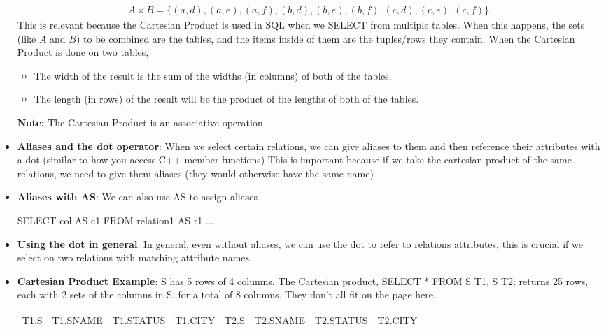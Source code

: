 \documentclass{report}
\begin{document}
\begin{itemize}
        \begin{align*}
            A \times B = \{(a, d), (a, e), (a, f), (b , d), (b , e), (b ,f), (c, d), (c, e), (c, f)\}
        .\end{align*}
        \bigbreak \noindent 
        This is relevant because the Cartesian Product is used in SQL when we SELECT from multiple tables. When this happens, the sets (like $A$ and $B$) to be combined are the tables, and the items inside of them are the tuples/rows they contain.
        \bigbreak \noindent 
        When the Cartesian Product is done on two tables,
        \begin{itemize}
            \item The width of the result is the sum of the widths (in columns) of both of the tables.
            \item The length (in rows) of the result will be the product of the lengths of both of the tables.
        \end{itemize}
        \bigbreak \noindent 
        \textbf{Note:} The Cartesian Product is an associative operation
    \item \textbf{Aliases and the dot operator}: When we select certain relations, we can give aliases to them and then reference their attributes with a dot (similar to how you access C++ member functions)
        \bigbreak \noindent 
        This is important because if we take the cartesian product of the same relations, we need to give them aliases (they would otherwise have the same name)
    \item \textbf{Aliases with AS}: We can also use AS to assign aliases
        \bigbreak \noindent 
        \begin{sqlcode}
        SELECT col AS c1
            FROM relation1 AS r1
            ...
        \end{sqlcode}
    \item \textbf{Using the dot in general}: In general, even without aliases, we can use the dot to refer to relations attributes, this is crucial if we select on two relations with matching attribute names.
    \item \textbf{Cartesian Product Example}: S has 5 rows of 4 columns. The Cartesian product, SELECT * FROM S T1, S T2; returns 25 rows, each with 2 sets of the columns in S, for a total of 8 columns. They don’t all fit on the page here.
        \bigbreak \noindent 
        \begin{center}
            \begin{tabular}{c|c|c|c|c|c|c|c}
                T1.S &T1.SNAME &T1.STATUS &T1.CITY &T2.S &T2.SNAME &T2.STATUS &T2.CITY \\

\end{tabular}
\end{center}
\end{itemize}
\end{document}
